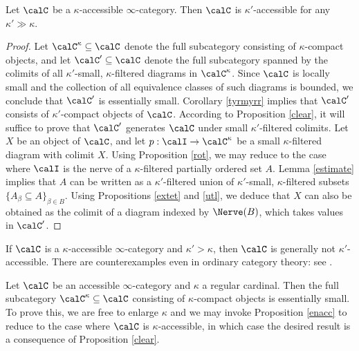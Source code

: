 \begin{proposition}\label{enacc}
Let $\calC$ be a $\kappa$-accessible $\infty$-category. Then
$\calC$ is $\kappa'$-accessible for any $\kappa' \gg \kappa$.
\end{proposition}

\begin{proof}
Let $\calC^{\kappa} \subseteq \calC$ denote the full subcategory consisting of $\kappa$-compact objects, and let $\calC' \subseteq \calC$ denote the full subcategory spanned by the colimits of all $\kappa'$-small, $\kappa$-filtered diagrams in $\calC^{\kappa}$. Since $\calC$ is locally small and the collection of all equivalence classes of such diagrams is bounded, we conclude that $\calC'$ is essentially small. Corollary \ref{tyrmyrr} implies that $\calC'$ consists of $\kappa'$-compact objects of $\calC$. According to Proposition \ref{clear}, it will suffice to prove that $\calC'$ generates $\calC$ under small $\kappa'$-filtered colimits. Let $X$ be an object of $\calC$, and let
$p: \calI \rightarrow \calC^{\kappa}$ be a small $\kappa$-filtered diagram with colimit $X$.
Using Proposition \ref{rot}, we may reduce to the case where $\calI$ is the nerve of a $\kappa$-filtered partially ordered set $A$. Lemma \ref{estimate} implies that $A$ can be written as a $\kappa'$-filtered union of $\kappa'$-small, $\kappa$-filtered subsets $\{ A_{\beta} \subseteq A \}_{\beta \in B}$. Using Propositions \ref{extet} and \ref{utl}, we deduce that $X$ can also be obtained as the colimit of a diagram indexed by $\Nerve(B)$, which takes values in $\calC'$.
\end{proof}

\begin{remark}
If $\calC$ is a $\kappa$-accessible $\infty$-category and $\kappa' > \kappa$, then $\calC$ is generally not $\kappa'$-accessible. There are counterexamples even in ordinary category theory: see \cite{adamek}.
\end{remark}

\begin{remark}\label{boundedacc}
Let $\calC$ be an accessible $\infty$-category and $\kappa$ a regular cardinal. Then the full subcategory $\calC^{\kappa} \subseteq \calC$ consisting of $\kappa$-compact objects is essentially small. To prove this, we are free to enlarge $\kappa$ and we may invoke Proposition \ref{enacc} to reduce to the case where $\calC$ is $\kappa$-accessible, in which case the desired result is a consequence of Proposition \ref{clear}.
\end{remark}

